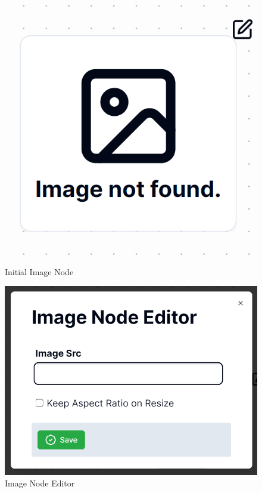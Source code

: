 \begin{figure}[hbt!]
    \centering
    \begin{minipage}{0.45\textwidth}
        \centering
        \includegraphics[width=0.72\linewidth]{images/image-node.png}
        \caption{Initial Image Node}
        \label{fig:image-node}
    \end{minipage}%
    \hspace{0.1\textwidth}%
    \begin{minipage}{0.45\textwidth}
        \centering
        \includegraphics[width=1\linewidth]{images/image-node-editor.png}
        \caption{Image Node Editor}
        \label{fig:image-node-editor}
    \end{minipage}
\end{figure}

